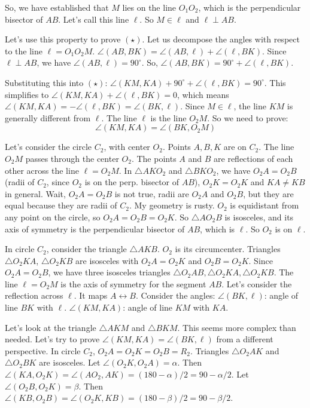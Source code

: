 So, we have established that $M$ lies on the line $O_1O_2$, which is the perpendicular bisector of $AB$. Let's call this line $\ell$. So $M \in \ell$ and $\ell \perp AB$.

Let's use this property to prove $(\star)$. Let us decompose the angles with respect to the line $\ell = O_1O_2M$.
$\angle(AB, BK) = \angle(AB, \ell) + \angle(\ell, BK)$.
Since $\ell \perp AB$, we have $\angle(AB, \ell) = 90^\circ$.
So, $\angle(AB, BK) = 90^\circ + \angle(\ell, BK)$.

Substituting this into $(\star)$:
$\angle(KM, KA) + 90^\circ + \angle(\ell, BK) = 90^\circ$.
This simplifies to $\angle(KM, KA) + \angle(\ell, BK) = 0$, which means $\angle(KM, KA) = -\angle(\ell, BK) = \angle(BK, \ell)$.
Since $M \in \ell$, the line $KM$ is generally different from $\ell$. The line $\ell$ is the line $O_2M$.
So we need to prove:
$$ \angle(KM, KA) = \angle(BK, O_2M) $$

Let's consider the circle $C_2$, with center $O_2$. Points $A, B, K$ are on $C_2$. The line $O_2M$ passes through the center $O_2$. The points $A$ and $B$ are reflections of each other across the line $\ell = O_2M$.
In $\triangle AKO_2$ and $\triangle BKO_2$, we have $O_2A = O_2B$ (radii of $C_2$, since $O_2$ is on the perp. bisector of $AB$), $O_2K=O_2K$ and $KA \neq KB$ in general. Wait, $O_2A=O_2B$ is not true, radii are $O_2A$ and $O_2B$, but they are equal because they are radii of $C_2$. My geometry is rusty. $O_2$ is equidistant from any point on the circle, so $O_2A=O_2B=O_2K$.
So $\triangle AO_2B$ is isosceles, and its axis of symmetry is the perpendicular bisector of $AB$, which is $\ell$. So $O_2$ is on $\ell$.

In circle $C_2$, consider the triangle $\triangle AKB$. $O_2$ is its circumcenter. Triangles $\triangle O_2KA$, $\triangle O_2KB$ are isosceles with $O_2A=O_2K$ and $O_2B=O_2K$. Since $O_2A=O_2B$, we have three isosceles triangles $\triangle O_2AB, \triangle O_2KA, \triangle O_2KB$.
The line $\ell=O_2M$ is the axis of symmetry for the segment $AB$.
Let's consider the reflection across $\ell$. It maps $A \leftrightarrow B$.
Consider the angles:
$\angle(BK, \ell)$: angle of line $BK$ with $\ell$.
$\angle(KM, KA)$: angle of line $KM$ with $KA$.

Let's look at the triangle $\triangle AKM$ and $\triangle BKM$.
This seems more complex than needed. Let's try to prove $\angle(KM, KA) = \angle(BK, \ell)$ from a different perspective.
In circle $C_2$, $O_2A=O_2K=O_2B=R_2$. Triangles $\triangle O_2AK$ and $\triangle O_2BK$ are isosceles.
Let $\angle(O_2K, O_2A) = \alpha$. Then $\angle(KA, O_2K) = \angle(AO_2, AK) = (180-\alpha)/2 = 90-\alpha/2$.
Let $\angle(O_2B, O_2K) = \beta$. Then $\angle(KB, O_2B) = \angle(O_2K, KB) = (180-\beta)/2 = 90-\beta/2$.


